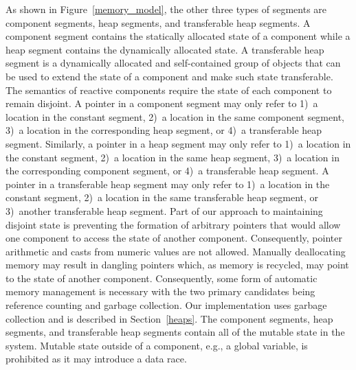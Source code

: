 As shown in Figure~\ref{memory_model}, the other three types of segments are component segments, heap segments, and transferable heap segments.
A component segment contains the statically allocated state of a component while a heap segment contains the dynamically allocated state.
A transferable heap segment is a dynamically allocated and self-contained group of objects that can be used to extend the state of a component and make such state transferable.
The semantics of reactive components require the state of each component to remain disjoint.
A pointer in a component segment may only refer to 1)~a location in the constant segment, 2)~a location in the same component segment, 3)~a location in the corresponding heap segment, or 4)~a transferable heap segment.
Similarly, a pointer in a heap segment may only refer to 1)~a location in the constant segment, 2)~a location in the same heap segment, 3)~a location in the corresponding component segment, or 4)~a transferable heap segment.
A pointer in a transferable heap segment may only refer to 1)~a location in the constant segment, 2)~a location in the same transferable heap segment, or 3)~another transferable heap segment.
Part of our approach to maintaining disjoint state is preventing the formation of arbitrary pointers that would allow one component to access the state of another component.
Consequently, pointer arithmetic and casts from numeric values are not allowed.
Manually deallocating memory may result in dangling pointers which, as memory is recycled, may point to the state of another component.
Consequently, some form of automatic memory management is necessary with the two primary candidates being reference counting and garbage collection.
Our implementation uses garbage collection and is described in Section~\ref{heaps}.
The component segments, heap segments, and transferable heap segments contain all of the mutable state in the system.
Mutable state outside of a component, e.g., a global variable, is prohibited as it may introduce a data race.

